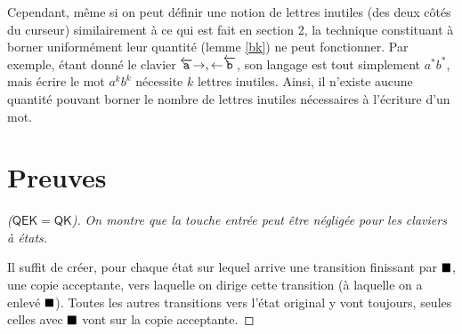 \documentclass[12pt, a4paper]{article}
\begin{document}
    Cependant, même si on peut définir une notion de lettres inutiles (des deux côtés du curseur) similairement à ce qui est fait en section 2, la technique constituant à borner uniformément leur quantité (lemme \ref{bk}) ne peut fonctionner.
    Par exemple, étant donné le clavier ${\overleftarrow{\mathtt{a}}\mathord{\rightarrow},\mathord{\leftarrow}\overleftarrow{\mathtt{b}}}$, son langage est tout simplement $a^*b^*$, mais écrire le mot $a^kb^k$ nécessite $k$ lettres inutiles. Ainsi, il n'existe aucune quantité pouvant borner le nombre de lettres inutiles nécessaires à l'écriture d'un mot.
    
    \clearpage
    \appendix
    \section{Preuves}
    \begin{proof}[($\mathsf{QEK} = \mathsf{QK}$)]
        \emph{On montre que la touche entrée peut être négligée pour les claviers à états.} 

        Il suffit de créer, pour chaque état sur lequel arrive une transition finissant par $\mathord{\blacksquare}$, une copie acceptante, vers laquelle on dirige cette transition (à laquelle on a enlevé $\mathord{\blacksquare}$).
        Toutes les autres transitions vers l'état original y vont toujours, seules celles avec $\mathord{\blacksquare}$ vont sur la copie acceptante. \medskip

    \end{proof}
\end{document}
